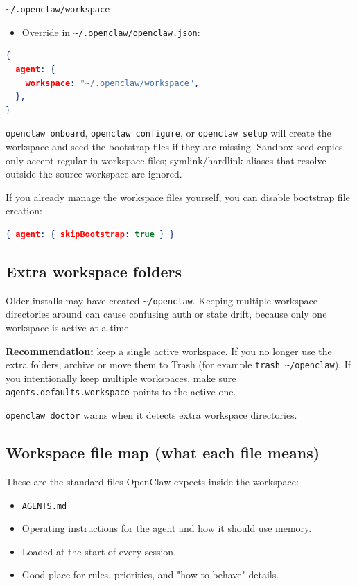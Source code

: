 \texttt{\textasciitilde{}/.openclaw/workspace-}.
\begin{itemize}
  \item Override in \texttt{\textasciitilde{}/.openclaw/openclaw.json}:
\end{itemize}


\begin{lstlisting}[language=json]
{
  agent: {
    workspace: "~/.openclaw/workspace",
  },
}
\end{lstlisting}


\texttt{openclaw onboard}, \texttt{openclaw configure}, or \texttt{openclaw setup} will create the
workspace and seed the bootstrap files if they are missing.
Sandbox seed copies only accept regular in-workspace files; symlink/hardlink
aliases that resolve outside the source workspace are ignored.

If you already manage the workspace files yourself, you can disable bootstrap
file creation:

\begin{lstlisting}[language=json]
{ agent: { skipBootstrap: true } }
\end{lstlisting}


\subsection{Extra workspace folders}


Older installs may have created \texttt{\textasciitilde{}/openclaw}. Keeping multiple workspace
directories around can cause confusing auth or state drift, because only one
workspace is active at a time.

\textbf{Recommendation:} keep a single active workspace. If you no longer use the
extra folders, archive or move them to Trash (for example \texttt{trash \textasciitilde{}/openclaw}).
If you intentionally keep multiple workspaces, make sure
\texttt{agents.defaults.workspace} points to the active one.

\texttt{openclaw doctor} warns when it detects extra workspace directories.

\subsection{Workspace file map (what each file means)}


These are the standard files OpenClaw expects inside the workspace:

\begin{itemize}
  \item \texttt{AGENTS.md}
  \item Operating instructions for the agent and how it should use memory.
  \item Loaded at the start of every session.
  \item Good place for rules, priorities, and "how to behave" details.
\end{itemize}


